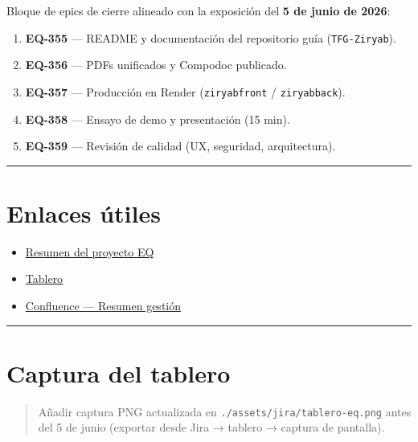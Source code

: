 \documentclass[
  spanish,
  11pt,
]{report}
\providecommand{\tightlist}{%
  \setlength{\itemsep}{0pt}\setlength{\parskip}{0pt}}
\begin{document}
Bloque de epics de cierre alineado con la exposición del \textbf{5 de
junio de 2026}:

\begin{enumerate}
\def\labelenumi{\arabic{enumi}.}
\tightlist
\item
  \textbf{EQ-355} --- README y documentación del repositorio guía
  (\texttt{TFG-Ziryab}).
\item
  \textbf{EQ-356} --- PDFs unificados y Compodoc publicado.
\item
  \textbf{EQ-357} --- Producción en Render (\texttt{ziryabfront} /
  \texttt{ziryabback}).
\item
  \textbf{EQ-358} --- Ensayo de demo y presentación (15 min).
\item
  \textbf{EQ-359} --- Revisión de calidad (UX, seguridad, arquitectura).
\end{enumerate}

\begin{center}\rule{0.5\linewidth}{0.5pt}\end{center}

\section{Enlaces útiles}\label{enlaces-uxfatiles}

\begin{itemize}
\tightlist
\item
  \href{https://g-team-ddm5j4dr.atlassian.net/jira/software/projects/EQ/summary}{Resumen
  del proyecto EQ}
\item
  \href{https://g-team-ddm5j4dr.atlassian.net/jira/software/projects/EQ/boards}{Tablero}
\item
  \href{https://g-team-ddm5j4dr.atlassian.net/wiki/spaces/Ziryab/pages/13500417}{Confluence
  --- Resumen gestión}
\end{itemize}

\begin{center}\rule{0.5\linewidth}{0.5pt}\end{center}

\section{Captura del tablero}\label{captura-del-tablero}

\begin{quote}
Añadir captura PNG actualizada en \texttt{./assets/jira/tablero-eq.png}
antes del 5 de junio (exportar desde Jira → tablero → captura de
pantalla).
\end{quote}
\end{document}
